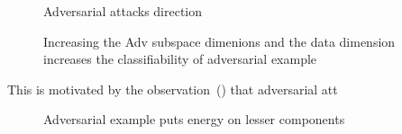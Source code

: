   \begin{figure}[t]
    \centering
    \def\svgwidth{0.99\columnwidth}
    
    \caption{Adversarial attacks direction}
    \label{fig:dir-adv-att}
\end{figure}


\begin{figure}[t]
  \centering
  \begin{subfigure}[t]{0.49\linewidth}
    \def\svgwidth{0.99\columnwidth}
    
    \label{fig:dir-adv-att-repr}
  \end{subfigure}
  \begin{subfigure}[t]{0.49\linewidth}
    \def\svgwidth{0.99\columnwidth}
    
    \label{fig:dir-adv-att-inp}
  \end{subfigure}
  \caption{Increasing the Adv subspace dimenions and the data dimension increases the classifiability of adversarial example}
\end{figure}



This is motivated by the observation~() that adversarial att

\begin{figure}[t]
  \centering
  \begin{subfigure}[t]{0.32\linewidth}
    \def\svgwidth{0.99\columnwidth}
    
    \label{fig:1-prin-comp}
  \end{subfigure}
  \begin{subfigure}[t]{0.32\linewidth}
    \def\svgwidth{0.99\columnwidth}
    
    \label{fig:2-prin-comp}
  \end{subfigure}
  \begin{subfigure}[t]{0.32\linewidth}
    \def\svgwidth{0.99\columnwidth}
    
    \label{fig:3-prin-comp}
  \end{subfigure}
  \caption{Adversarial example puts energy on lesser components}
\end{figure}